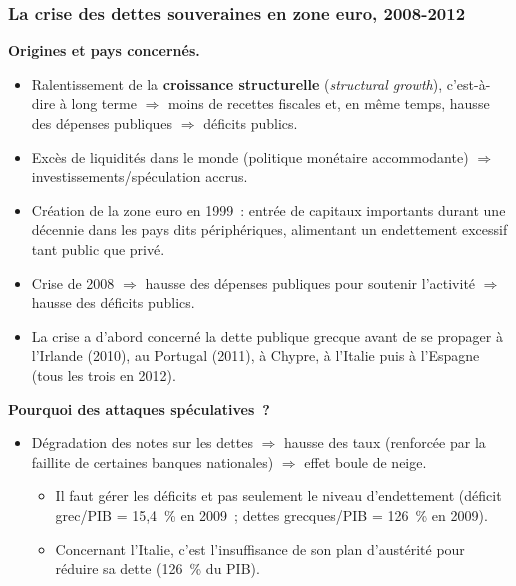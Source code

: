 \subsubsection{La crise des dettes souveraines en zone euro, 2008-2012}

\textbf{Origines et pays concernés.}
\begin{itemize}
  \item Ralentissement de la \textbf{croissance structurelle} (\textit{structural
    growth}), c'est-à-dire à long terme $\Rightarrow$ moins de recettes fiscales et, en
    même temps, hausse des dépenses publiques $\Rightarrow$ déficits publics.
  \item Excès de liquidités dans le monde (politique monétaire accommodante)
    $\Rightarrow$ investissements/spéculation accrus.
  \item Création de la zone euro en 1999~: entrée de capitaux importants durant une
    décennie dans les pays dits périphériques, alimentant un endettement excessif tant
    public que privé.
  \item Crise de 2008 $\Rightarrow$ hausse des dépenses publiques pour soutenir
    l'activité $\Rightarrow$ hausse des déficits publics.
  \item La crise a d'abord concerné la dette publique grecque avant de se propager à
    l'Irlande (2010), au Portugal (2011), à Chypre, à l'Italie puis à l'Espagne (tous
    les trois en 2012).
\end{itemize}

\textbf{Pourquoi des attaques spéculatives~?}
\begin{itemize}
  \item Dégradation des notes sur les dettes $\Rightarrow$ hausse des taux (renforcée
    par la faillite de certaines banques nationales) $\Rightarrow$ effet boule de
    neige.
    \begin{itemize}
      \item Il faut gérer les déficits et pas seulement le niveau d'endettement
        (déficit grec/PIB = 15,4~\% en 2009~; dettes grecques/PIB = 126~\% en 2009).
      \item Concernant l'Italie, c'est l'insuffisance de son plan d'austérité pour
        réduire sa dette (126~\% du PIB).
    \end{itemize}
\end{itemize}

